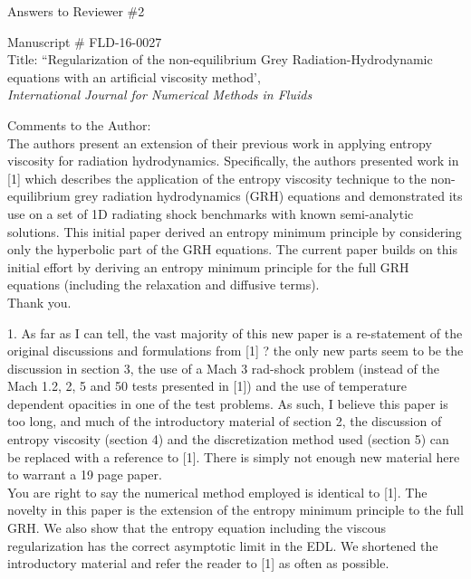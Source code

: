 \documentclass{article}
\begin{document}
\begin{center}
{ \Large Answers to Reviewer \#2}
\end{center}

\bigskip

\noindent Manuscript \# FLD-16-0027 \\
Title: ``Regularization of the non-equilibrium Grey Radiation-Hydrodynamic equations with an artificial viscosity method', \\
{\it International Journal for Numerical Methods in Fluids}\\

\bigskip
\bigskip

{\color{blue}
Comments to the Author: \\ 
The authors present an extension of their previous work in applying entropy viscosity for radiation hydrodynamics. Specifically, the authors presented work in [1] which describes the application of the entropy viscosity technique to the non-equilibrium grey radiation hydrodynamics (GRH) equations and demonstrated its use on a set of 1D radiating shock benchmarks with known semi-analytic solutions. This initial paper derived an entropy minimum principle by considering only the hyperbolic part of the GRH equations. The current paper builds on this initial effort by deriving an entropy minimum principle for the full GRH equations (including the relaxation and diffusive terms).\\}
Thank you.
\bigskip

{\color{blue}
1. As far as I can tell, the vast majority of this new paper is a re-statement of the original discussions and formulations from [1] ? the only new parts seem to be the discussion in section 3, the use of a Mach 3 rad-shock problem (instead of the Mach 1.2, 2, 5 and 50 tests presented in [1]) and the use of temperature dependent opacities in one of the test problems. As such, I believe this paper is too long, and much of the introductory material of section 2, the discussion of entropy viscosity (section 4) and the discretization method used (section 5) can be replaced with a reference to [1]. There is simply not enough new material here to warrant a 19 page paper. \\}
You are right to say the numerical method employed is identical to [1]. The novelty in this paper is the extension of the entropy minimum principle to the full GRH. We also show that the entropy equation including the viscous regularization has the correct asymptotic limit in the EDL. We shortened the introductory material and refer the reader to [1] as often as possible.
\bigskip
\end{document}
